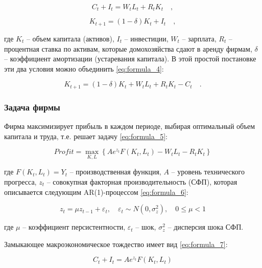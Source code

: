 \documentclass[a4paper,12pt]{article}
\begin{document}
{\begin{equation}
C_t + I_t = W_t L_t + R_t K_t \quad ,
\label{eq:formula_2}
\end{equation}

\begin{equation}
K_{t+1} = (1 - \delta) K_t + I_t \quad ,
\label{eq:formula_3}
\end{equation}

где $K_t$ -- объем капитала (активов), $I_t$ -- инвестиции, $W_t$ -- зарплата, $R_t$ -- процентная ставка по активам, которые домохозяйства сдают в аренду фирмам, $\delta$ -- коэффициент амортизации (устаревания капитала). В этой простой постановке эти два условия можно объединить \eqref{eq:formula_4}:

\begin{equation}
K_{t+1} = (1 - \delta) K_t + W_t L_t + R_t K_t - C_t \quad .
\label{eq:formula_4}
\end{equation}

\subsubsection{Задача фирмы}

Фирма максимизирует прибыль в каждом периоде, выбирая оптимальный объем капитала и труда, т.е. решает задачу \eqref{eq:formula_5}:

\begin{equation}
Profit = \max_{K, L} \left\{ A e^{z_t} F(K_t, L_t) - W_t L_t - R_t K_t \right\}
\label{eq:formula_5}
\end{equation}

где $F(K_t, L_t) = Y_t$ -- производственная функция, $A$ -- уровень технического прогресса, $z_t$ -- совокупная факторная производительность (СФП), которая описывается следующим AR(1)-процессом \eqref{eq:formula_6}:

\begin{equation}
z_t = \mu z_{t-1} + \varepsilon_t, \quad \varepsilon_t \sim N(0, \sigma_z^2), \quad 0 \leq \mu < 1
\label{eq:formula_6}
\end{equation}

где $\mu$ -- коэффициент персистентности, $\varepsilon_t$ -- шок, $\sigma_z^2$ -- дисперсия шока СФП.

Замыкающее макроэкономическое тождество имеет вид \eqref{eq:formula_7}:

\begin{equation}
C_t + I_t = A e^{z_t} F(K_t, L_t)
\label{eq:formula_7}
\end{equation}

}
\end{document}

